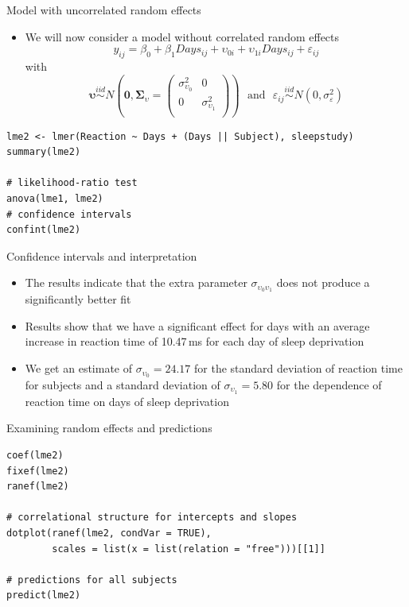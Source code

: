 \documentclass[aspectratio=169]{beamer}
\newcommand{\gvect}[1]{\boldsymbol{#1}}
\newcommand{\gmat}[1]{\boldsymbol{#1}}
\begin{document}
\begin{frame}[fragile]{Model with uncorrelated random effects}
  \begin{itemize}
    \item We will now consider a model without correlated random effects
  \[
    y_{ij} = \beta_0 + \beta_1 Days_{ij} + \upsilon_{0i} + \upsilon_{1i} Days_{ij} +
    \varepsilon_{ij}
  \]
with
      \[
  \gvect{\upsilon}  \overset{iid}{\sim} N\left(\gvect{0}, \gmat{\Sigma}_{\upsilon} = 
    \begin{pmatrix}
      \sigma^2_{\upsilon_0} & 0 \\
      0 & \sigma^2_{\upsilon_1} \\
    \end{pmatrix}\right) ~~~\text{and}~~~
  \varepsilon_{ij}  \overset{iid}{\sim} N(0, \sigma_{\varepsilon}^2)
\]
  \end{itemize}
  \begin{lstlisting}
lme2 <- lmer(Reaction ~ Days + (Days || Subject), sleepstudy)
summary(lme2)

# likelihood-ratio test
anova(lme1, lme2)
# confidence intervals
confint(lme2)
  \end{lstlisting}
\end{frame}

\begin{frame}{Confidence intervals and interpretation}
  \begin{itemize}
    \item The results indicate that the extra parameter
      $\sigma_{\upsilon_0\upsilon_1}$ does not produce a significantly
      better fit
    \item Results show that we have a significant effect for days with an
  average increase in reaction time of 10.47\,ms for each day of sleep
  deprivation
    \item We get an estimate of $\sigma_{\upsilon_0} = 24.17$ for the
      standard deviation of reaction time for subjects and a standard
      deviation of $\sigma_{\upsilon_1} = 5.80$ for the dependence of
      reaction time on days of sleep deprivation
  \end{itemize}
\end{frame}

\begin{frame}[fragile]{Examining random effects and predictions}
      \begin{lstlisting}
coef(lme2)
fixef(lme2)
ranef(lme2)

# correlational structure for intercepts and slopes
dotplot(ranef(lme2, condVar = TRUE),
        scales = list(x = list(relation = "free")))[[1]]

# predictions for all subjects
predict(lme2)
      \end{lstlisting}
\end{frame}
\end{document}
